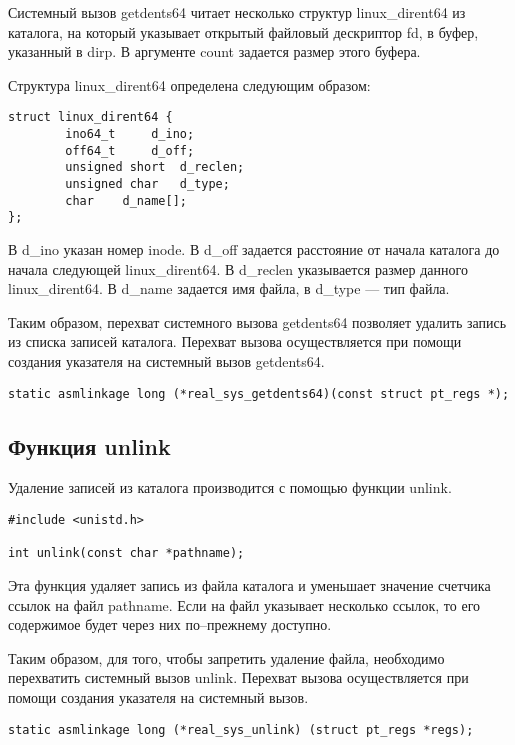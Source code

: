 Системный вызов getdents64 читает несколько структур linux\_dirent64 из каталога, на который указывает открытый файловый дескриптор fd, в буфер, указанный в dirp. В аргументе count задается размер этого буфера.

Структура linux\_dirent64 определена следующим образом:
\clearpage
\begin{lstlisting}[label=code:linuxdirent64,caption=Структура linux\_dirent64]
struct linux_dirent64 {
		ino64_t		d_ino;
		off64_t		d_off;    
		unsigned short	d_reclen; 
		unsigned char	d_type;  
		char	d_name[]; 
};
\end{lstlisting}

В d\_ino указан номер inode. В d\_off задается расстояние от начала каталога до начала следующей linux\_dirent64. В d\_reclen указывается размер данного linux\_dirent64. В d\_name задается имя файла, в d\_type --- тип файла.
 
Таким образом, перехват системного вызова getdents64 позволяет удалить запись из списка записей каталога.
Перехват вызова осуществляется при помощи создания указателя на системный вызов getdents64.

\begin{lstlisting}[label=code:getdents_p,caption=Указатель на getdents64]
static asmlinkage long (*real_sys_getdents64)(const struct pt_regs *);
\end{lstlisting}

\subsection{Функция unlink}

Удаление записей из каталога производится с помощью функции unlink.

\begin{lstlisting}[label=code:unlink,caption=Функция unlink]
#include <unistd.h>

int unlink(const char *pathname);
\end{lstlisting}

Эта функция удаляет запись из файла каталога и уменьшает значение счетчика ссылок на файл pathname. Если на файл указывает несколько ссылок, то его содержимое будет через них по--прежнему доступно.

Таким образом, для того, чтобы запретить удаление файла, необходимо перехватить системный вызов unlink.
Перехват вызова осуществляется при помощи создания указателя на системный вызов.

\begin{lstlisting}[label=code:unlink_p,caption=Указатель на unlink]
static asmlinkage long (*real_sys_unlink) (struct pt_regs *regs);
\end{lstlisting}



